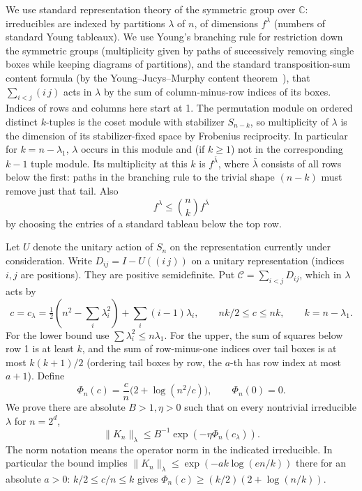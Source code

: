 We use standard representation theory of the symmetric group over \(\mathbb C\): irreducibles are indexed by partitions \(\lambda\) of \(n\), of dimensions \(f^\lambda\) (numbers of standard Young tableaux). We use Young's branching rule for restriction down the symmetric groups (multiplicity given by paths of successively removing single boxes while keeping diagrams of partitions), and the standard transposition-sum content formula (by the Young--Jucys--Murphy content theorem~\cite[Eq.~(2.1), Proposition~5.3 and Theorem~5.8]{VershikOkounkov2005}), that \(\sum_{i<j}(i\,j)\) acts in \(\lambda\) by the sum of column-minus-row indices of its boxes. Indices of rows and columns here start at 1. The permutation module on ordered distinct \(k\)-tuples is the coset module with stabilizer \(S_{n-k}\), so multiplicity of \(\lambda\) is the dimension of its stabilizer-fixed space by Frobenius reciprocity. In particular for \(k=n-\lambda_1\), \(\lambda\) occurs in this module and (if \(k\ge1\)) not in the corresponding \(k-1\) tuple module. Its multiplicity at this \(k\) is \(f^{\bar\lambda}\), where \(\bar\lambda\) consists of all rows below the first: paths in the branching rule to the trivial shape \((n-k)\) must remove just that tail. Also
\begin{equation}
f^\lambda\le \binom{n}{k} f^{\bar\lambda}
\label{cas:e7}
\end{equation}
by choosing the entries of a standard tableau below the top row.

Let $U$ denote the unitary action of $S_n$ on the representation currently
under consideration.  Write \(D_{ij}=I-U((i\,j))\) on a unitary representation (indices \(i,j\) are positions). They are positive semidefinite. Put \(\mathcal C=\sum_{i<j}D_{ij}\), which in \(\lambda\) acts by
\begin{equation}
c=c_\lambda=\tfrac12(n^2-\textstyle\sum_i\lambda_i^2)+\sum_i(i-1)\lambda_i,\qquad
nk/2\le c\le nk,\qquad k=n-\lambda_1.
\label{cas:e8}
\end{equation}
For the lower bound use \(\sum\lambda_i^2\le n\lambda_1\). For the upper, the sum of squares below row 1 is at least \(k\), and the sum of row-minus-one indices over tail boxes is at most \(k(k+1)/2\) (ordering tail boxes by row, the \(a\)-th has row index at most \(a+1\)). Define
\[
\Phi_n(c)=\frac{c}{n}\big(2+\log(n^2/c)\big),\qquad \Phi_n(0)=0.
\]
We prove there are absolute \(B>1,\eta>0\) such that on every nontrivial irreducible \(\lambda\) for \(n=2^d\),
\begin{equation}
\|K_n\|_{\lambda}\le B^{-1}\exp(-\eta\Phi_n(c_\lambda)).
\label{cas:e9}
\end{equation}
The norm notation means the operator norm in the indicated irreducible. In particular the bound implies \(\|K_n\|_\lambda\le\exp(-a k\log(e n/k))\) there for an absolute \(a>0\): \(k/2\le c/n\le k\) gives \(\Phi_n(c)\ge(k/2)(2+\log(n/k))\).


